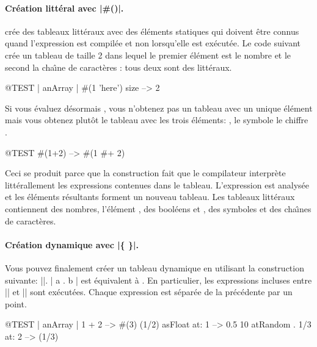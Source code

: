 \documentclass[a4paper,10pt,twoside]{book}
\begin{document}
\paragraph{Cr\'eation litt\'eral avec \ct|\#()|.}
\ct{#()} cr\'ee des tableaux littéraux avec des \'el\'ements
statiques qui doivent \^etre connus
quand l'expression est compil\'ee et non lorsqu'elle est ex\'ecut\'ee.
Le code suivant cr\'ee un tableau de taille 2
dans lequel le premier \'el\'ement est le nombre 
et le second la cha\^{\i}ne de caract\`eres : tous deux sont des litt\'eraux.


\begin{code}{@TEST | anArray |}
#(1 'here') size --> 2
\end{code}

Si vous \'evaluez d\'esormais , vous n'obtenez pas un tableau
avec un unique \'el\'ement  mais vous obtenez plut\^ot le tableau
 \ie avec les trois \'el\'ements: , le symbole
\ct{#+} le chiffre .

\begin{code}{@TEST}
#(1+2) -->  #(1 #+ 2)
\end{code}

\noindent
Ceci se produit parce que la construction \ct{#()} fait que
le compilateur interpr\`ete litt\'erallement les expressions contenues dans
le tableau. L'expression est analys\'ee et les \'el\'ements r\'esultants
forment un nouveau tableau. Les tableaux litt\'eraux contiennent des
nombres, l'\'el\'ement , des bool\'eens  et ,
des symboles et des cha\^{\i}nes de caract\`eres.

\paragraph{Cr\'eation dynamique avec \ct|\{ \}|.}
Vous pouvez finalement cr\'eer un tableau dynamique en utilisant
la construction suivante: \ct|{}|. \ct|{ a . b }| est \'equivalent
\`a . En particulier, les expressions incluses
entre \ct|{| et \ct|}| sont ex\'ecut\'ees. Chaque expression est séparée de la précédente par un point.

\begin{code}{@TEST | anArray |}
{ 1 + 2 } --> #(3)
{(1/2) asFloat} at: 1 --> 0.5
{10 atRandom . 1/3} at: 2 --> (1/3)
\end{code}
\end{document}
